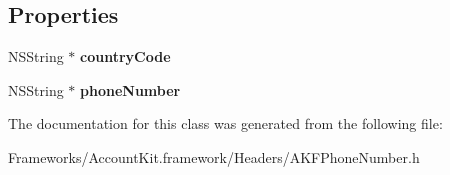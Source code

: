 \subsection*{Properties}
\begin{DoxyCompactItemize}
\item 
\hypertarget{interface_a_k_f_phone_number_a0ef95128dc06457d6fb9278eac64d86e}{}N\+S\+String $\ast$ {\bfseries country\+Code}\label{interface_a_k_f_phone_number_a0ef95128dc06457d6fb9278eac64d86e}

\item 
\hypertarget{interface_a_k_f_phone_number_a417b2dadffd96ad56b8d269dfbc3468d}{}N\+S\+String $\ast$ {\bfseries phone\+Number}\label{interface_a_k_f_phone_number_a417b2dadffd96ad56b8d269dfbc3468d}

\end{DoxyCompactItemize}


The documentation for this class was generated from the following file\+:\begin{DoxyCompactItemize}
\item 
Frameworks/\+Account\+Kit.\+framework/\+Headers/A\+K\+F\+Phone\+Number.\+h\end{DoxyCompactItemize}
